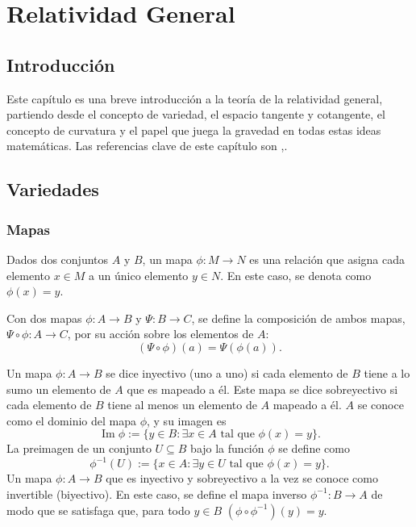 \chapter{Relatividad General}
\section{Introducción}
Este capítulo es una breve introducción a la teoría de la relatividad general, partiendo desde el concepto de variedad, el espacio tangente y cotangente, el concepto de curvatura y el papel que juega la gravedad en todas estas ideas matemáticas. Las referencias clave de este capítulo son \cite{Carroll},\cite{Munkres}.
\section{Variedades}
\subsection{Mapas}
\begin{defi}[Mapa]
	Dados dos conjuntos $A$ y $B$, un mapa $\phi:M\rightarrow N$ es una relación que asigna cada elemento $x\in M$ a un único elemento $y\in N$. En este caso, se denota como $\phi(x)=y$.
\end{defi}
\begin{defi}
	Con dos mapas $\phi:A\rightarrow B$ y $\Psi:B\rightarrow C$, se define la composición de ambos mapas, $\Psi\circ\phi:A\rightarrow C$, por su acción sobre los elementos de $A$:
	$$(\Psi\circ\phi)(a)=\Psi(\phi(a)).$$
\end{defi}
\begin{center}
\end{center}

Un mapa $\phi:A\rightarrow B$ se dice inyectivo (uno a uno) si cada elemento de $B$ tiene a lo sumo un elemento de $A$ que es mapeado a él. Este mapa se dice sobreyectivo si cada elemento de $B$ tiene al menos un elemento de $A$ mapeado a él. $A$ se conoce como el dominio del mapa $\phi$, y su imagen es
$$\mathop{Im}\phi:=\{y\in B: \exists x\in A \text{ tal que }\phi(x)=y\}.$$
La preimagen de un conjunto $U\subseteq B$ bajo la función $\phi$ se define como
$$\phi^{-1}(U):=\{ x\in A: \exists y \in U \text{ tal que }\phi(x)=y\}.$$
Un mapa $\phi:A\rightarrow B$ que es inyectivo y sobreyectivo a la vez se conoce como invertible (biyectivo). En este caso, se define el mapa inverso $\phi^{-1}:B\rightarrow A$ de modo que se satisfaga que, para todo $y\in B$ $(\phi\circ\phi^{-1})(y)=y.$
\begin{center}
\end{center}

